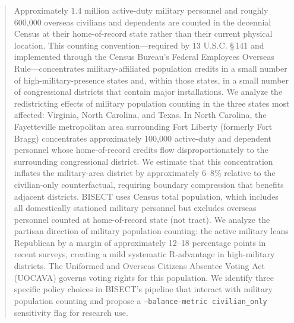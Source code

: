 \begin{abstract}
Approximately 1.4 million active-duty military personnel and roughly 600,000 overseas civilians and dependents are counted in the decennial Census at their home-of-record state rather than their current physical location. This counting convention---required by 13 U.S.C. \S\,141 and implemented through the Census Bureau's Federal Employees Overseas Rule---concentrates military-affiliated population credits in a small number of high-military-presence states and, within those states, in a small number of congressional districts that contain major installations. We analyze the redistricting effects of military population counting in the three states most affected: Virginia, North Carolina, and Texas. In North Carolina, the Fayetteville metropolitan area surrounding Fort Liberty (formerly Fort Bragg) concentrates approximately 100,000 active-duty and dependent personnel whose home-of-record credits flow disproportionately to the surrounding congressional district. We estimate that this concentration inflates the military-area district by approximately 6--8\% relative to the civilian-only counterfactual, requiring boundary compression that benefits adjacent districts. BISECT uses Census total population, which includes all domestically stationed military personnel but excludes overseas personnel counted at home-of-record state (not tract). We analyze the partisan direction of military population counting: the active military leans Republican by a margin of approximately 12--18 percentage points in recent surveys, creating a mild systematic R-advantage in high-military districts. The Uniformed and Overseas Citizens Absentee Voting Act (UOCAVA) governs voting rights for this population. We identify three specific policy choices in BISECT's pipeline that interact with military population counting and propose a \texttt{--balance-metric civilian\_only} sensitivity flag for research use.
\end{abstract}
